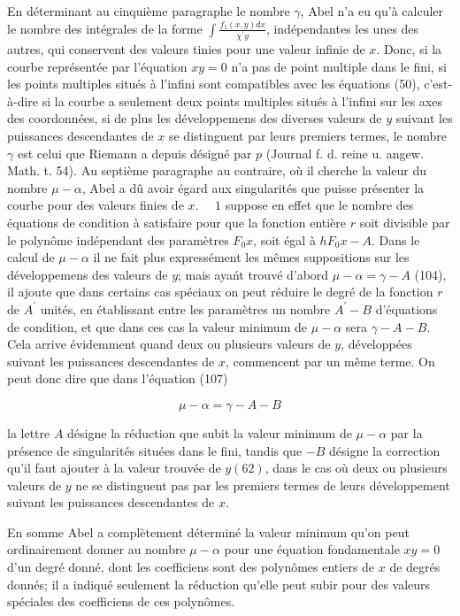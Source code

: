 \documentclass{article}
\begin{document}
En déterminant au cinquième paragraphe le nombre \(\gamma\), Abel n'a eu qu'à calculer le nombre des intégrales de la forme \(\int \frac{f_{1}(x, y) d x}{\chi^{\prime} y}\), indépendantes les unes des autres, qui conservent des valeurs tinies pour une valeur infinie de \(x\). Donc, si la courbe représentée par l'équation \(x y=0\) n'a pas de point multiple dans le fini, si les points multiples situés à l'infini sont compatibles avec les équations (50), c'est-à-dire si la courbe a seulement deux points multiples situés à l'infini sur les axes des coordonnées, si de plus les développemens des diverses valeurs de \(y\) suivant les puissances descendantes de \(x\) se distinguent par leurs premiers termes, le nombre \(\gamma\) est celui que Riemann a depuis désigné par \(p\) (Journal f. d. reine u. angew. Math. t. 54).
\(\mathrm{Au}\) septième paragraphe au contraire, où il cherche la valeur du nombre \(\mu-\alpha\), Abel a dû avoir égard aux singularités que puisse présenter la courbe pour des valeurs finies de \(x\). \(\quad 1\) suppose en effet que le nombre des équations de condition à satisfaire pour que la fonction entière \(r\) soit divisible par le polynôme indépendant des paramètres \(F_{0} x\), soit égal à \(h F_{0} x-A\). Dans le calcul de \(\mu-\alpha\) il ne fait plus expressément les mêmes suppositions sur les développemens des valeurs de \(y\); mais ayańt trouvé d'abord \(\mu-\alpha=\gamma-A\) (104), il ajoute que dans certains cas spéciaux on peut réduire le degré de la fonction \(r\) de \(A^{\prime}\) unités, en établissant entre les paramètres un nombre \(A^{\prime}-B\) d'équations de condition, et que dans ces cas la valeur minimum de \(\mu-\alpha\) sera \(\gamma-A-B\). Cela arrive évidemment quand deux ou plusieurs valeurs de \(y\), développées suivant les puissances descendantes de \(x\), commencent par un même terme. On peut donc dire que dans l'équation (107)

\[
\mu-\alpha=\gamma-A-B
\]

la lettre \(A\) désigne la réduction que subit la valeur minimum de \(\mu-\alpha\) par la présence de singularités situées dans le fini, tandis que \(-B\) désigne la correction qu'il faut ajouter à la valeur trouvée de \(y(62)\), dans le cas où deux ou plusieurs valeurs de \(y\) ne se distinguent pas par les premiers termes de leurs développement suivant les puissances descendantes de \(x\).

En somme Abel a complètement déterminé la valeur minimum qu'on peut ordinairement donner au nombre \(\mu-\alpha\) pour une équation fondamentale \(x y=0\) d'un degré donné, dont les coefficiens sont des polynômes entiers de \(x\) de degrés donnés; il a indiqué seulement la réduction qu'elle peut subir pour des valeurs spéciales des coefficiens de ces polynômes.
\end{document}
